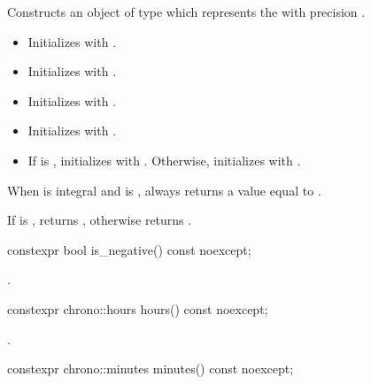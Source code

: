 \begin{itemdescr}
\pnum
\effects
Constructs an object of type 
which represents the  with precision .
\begin{itemize}
\item
  Initializes  with .
\item
  Initializes  with .
\item
  Initializes 
  with .
\item
  Initializes 
  with .
\item
  If  is ,
  initializes  with .
  Otherwise, initializes 
  with .
\end{itemize}
\begin{note}
When  is integral and
 is ,
 always returns a value equal to .
\end{note}

\pnum
\ensures
If  is ,
 returns ,
otherwise  returns .
\end{itemdescr}

%
\begin{itemdecl}
constexpr bool is_negative() const noexcept;
\end{itemdecl}

\begin{itemdescr}
\pnum
\returns
{}.
\end{itemdescr}

%
\begin{itemdecl}
constexpr chrono::hours hours() const noexcept;
\end{itemdecl}

\begin{itemdescr}
\pnum
\returns
{}.
\end{itemdescr}

%
\begin{itemdecl}
constexpr chrono::minutes minutes() const noexcept;
\end{itemdecl}

